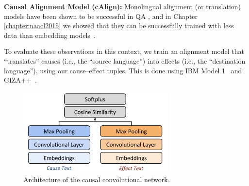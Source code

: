 {\flushleft \textbf{Causal Alignment Model (cAlign):}}
Monolingual alignment (or translation) models have been shown to be successful in QA \citep{Berger:00,Echihabi:03,Soricut:06,Riezler:etal:2007,Surdeanu:11,yao2013}, and in Chapter \ref{chapter:naacl2015} we showed that they can be successfully trained with less data than embedding models~\citep[see also][]{sharp-EtAl:2015:NAACL-HLT}. 

To evaluate these observations in this context, we train an alignment model that ``translates'' causes (i.e., the ``source language'') into effects (i.e., the ``destination language''), using our cause--effect tuples. 
This is done using IBM Model 1~\citep{Brown:93} and GIZA++~\citep{och03}. 

\begin{figure}[t!]
\begin{center}
\includegraphics[width=0.7\textwidth]{mainmatter/emnlp2016-causal/cnn2.png}
\caption{{\footnotesize Architecture of the causal convolutional network. }}
\label{fig:cnn}
\end{center}
\end{figure}


